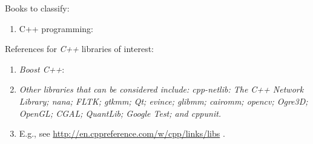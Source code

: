 Books to classify: \vspace{-0.3cm}
\begin{enumerate} \itemsep -4pt
\item C++ programming: \cite{Horstmann2012,Savitch2009,Prata2005,Romanik2003,Schildt2003a,Schildt1998a}
\end{enumerate}



References for {\it C++} libraries of interest: \vspace{-0.3cm}
\begin{enumerate} \itemsep -4pt
\item {\it Boost C++}: \cite{Mukherjee2015,Polukhin2013,Schaling2012,Karlsson2006a}
\item {\it Other libraries that can be considered include:  cpp-netlib: The C++ Network Library; nana; FLTK; gtkmm; Qt; evince; glibmm; cairomm; opencv; Ogre3D; OpenGL; CGAL; QuantLib; Google Test; and cppunit.}
\item E.g., see \url{http://en.cppreference.com/w/cpp/links/libs} \cite[Useful resources: List of C++ libraries -- A list of open source C++ libraries]{cppreference2015}.
\end{enumerate}



